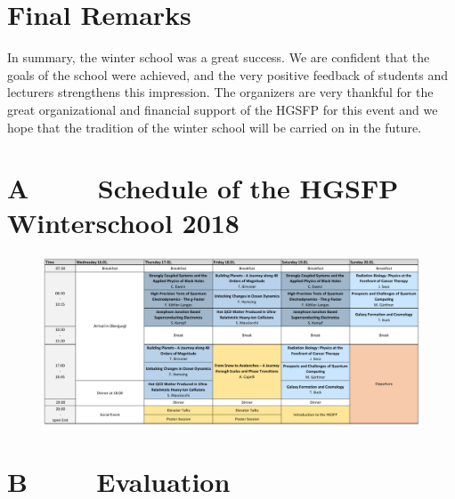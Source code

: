 \newpage




\section*{Final Remarks}
In summary, the winter school was a great success. We are confident that the goals of the school were achieved, and the very positive feedback of students and lecturers strengthens this impression. The organizers are very thankful for the great organizational and financial support of the HGSFP for this event and we hope that the tradition of the winter school will be carried on in the future.




\newpage
\abstract
\section*{A $\qquad$ Schedule of the HGSFP Winterschool 2018}

\begin{figure}[h!]
\centering
\includegraphics[scale=0.66, angle = 90 ]{figures/Program.jpg}
\end{figure}


\section*{B $\qquad$ Evaluation}

\newpage